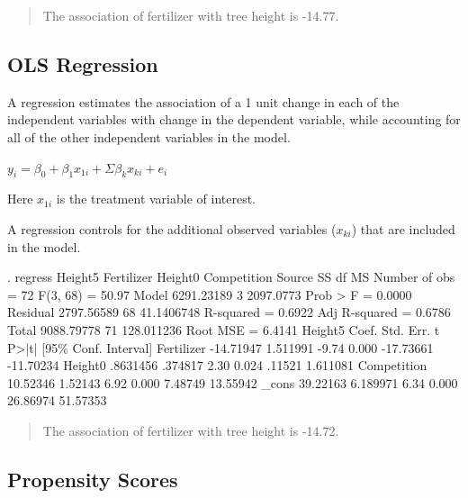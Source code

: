 \documentclass[
]{article}
\begin{document}
\begin{quote}
The association of fertilizer with tree height is -14.77.
\end{quote}

\hypertarget{ols-regression}{%
\subsection{OLS Regression}\label{ols-regression}}

A regression estimates the association of a 1 unit change in each of the
independent variables with change in the dependent variable, while
accounting for all of the other independent variables in the model.

\(y_i = \beta_0 + \beta_1 x_{1i} + \Sigma \beta_k x_{ki} + e_i\)

Here \(x_{1i}\) is the treatment variable of interest.

A regression controls for the additional observed variables (\(x_{ki}\))
that are included in the model.

\begin{stlog}
. regress Height5 Fertilizer Height0 Competition
{\smallskip}
      Source {\VBAR}       SS           df       MS      Number of obs   =        72
   F(3, 68)        =     50.97
       Model {\VBAR}  6291.23189         3   2097.0773   Prob > F        =    0.0000
    Residual {\VBAR}  2797.56589        68  41.1406748   R-squared       =    0.6922
   Adj R-squared   =    0.6786
       Total {\VBAR}  9088.79778        71  128.011236   Root MSE        =    6.4141
{\smallskip}
     Height5 {\VBAR}      Coef.   Std. Err.      t    P>|t|     [95\% Conf. Interval]
  Fertilizer {\VBAR}  -14.71947   1.511991    -9.74   0.000    -17.73661   -11.70234
     Height0 {\VBAR}   .8631456    .374817     2.30   0.024       .11521    1.611081
 Competition {\VBAR}   10.52346    1.52143     6.92   0.000      7.48749    13.55942
       _cons {\VBAR}   39.22163   6.189971     6.34   0.000     26.86974    51.57353
\end{stlog}

\begin{quote}
The association of fertilizer with tree height is -14.72.
\end{quote}

\hypertarget{propensity-scores}{%
\subsection{Propensity Scores}\label{propensity-scores}}
\end{document}
